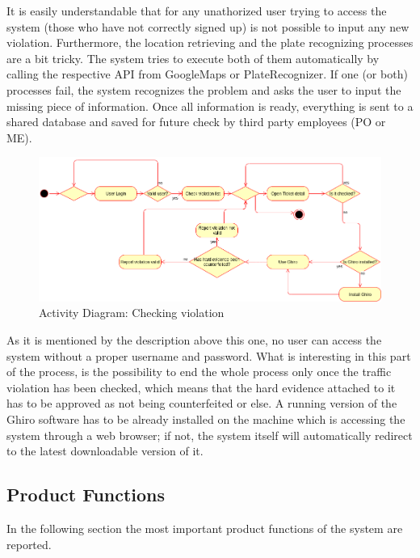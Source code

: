 \documentclass{article}
\begin{document}
It is easily understandable that for any unathorized user trying to access the
system (those who have not correctly signed up) is not possible to input any new
violation. Furthermore, the location retrieving and the plate recognizing
processes are a bit tricky. The system tries to execute both of them
automatically by calling the respective API from GoogleMaps or PlateRecognizer.
If one (or both) processes fail, the system recognizes the problem and asks the
user to input the missing piece of information. Once all information is ready,
everything is sent to a shared database and saved for future check by third
party employees (PO or ME). 


\begin{figure}[H]
    \centering
    \includegraphics[scale=0.36]{Images/ActivityCheckViolation}
    \caption{Activity Diagram: Checking violation}
\end{figure}

As it is mentioned by the description above this one, no user can access the system
without a proper username and password. What is interesting in this part of the
process, is the possibility to end the whole process only once the traffic
violation has been checked, which means that the hard evidence attached to it
has to be approved as not being counterfeited or else. A running version of the
Ghiro software has to be already installed on the machine which is accessing the
system through a web browser; if not, the system itself will automatically
redirect to the latest downloadable version of it. 

\subsection{Product Functions}
In the following section the most important product functions of the system are 
reported.
\end{document}
